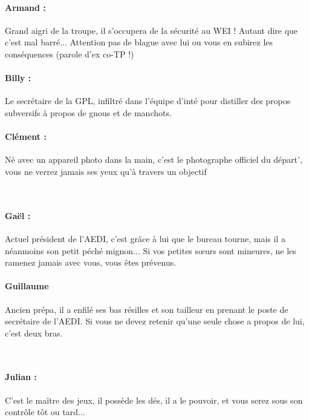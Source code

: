 \paragraph{Armand :} Grand aigri de la troupe, il s'occupera de la sécurité au WEI ! Autant dire que c'est mal barré... Attention pas de blague avec lui ou vous en subirez les conséquences (parole d'ex co-TP !)

\paragraph{Billy :} Le secrétaire de la GPL, infiltré dans l'équipe d'inté pour distiller des propos subversifs à propos de gnous et de manchots.

\paragraph{Clément :} Né avec un appareil photo dans la main, c'est le photographe officiel du départ', vous ne verrez jamais ses yeux qu'à travers un objectif

\columnbreak
~\\

\paragraph{Gaël :} Actuel président de l'AEDI, c'est grâce à lui que le bureau tourne, mais il a néanmoins son petit péché mignon... Si vos petites sœurs sont mineures, ne les ramenez jamais avec vous, vous êtes prévenus.

\paragraph{Guillaume} Ancien prépa, il a enfilé ses bas résilles et son tailleur en prenant le poste de secrétaire de l'AEDI. Si vous ne devez retenir qu'une seule chose a propos de lui, c'est deux bras.

~\\
\paragraph{Julian :} C'est le maître des jeux, il possède les dés, il a le pouvoir, et vous serez sous son contrôle tôt ou tard...

